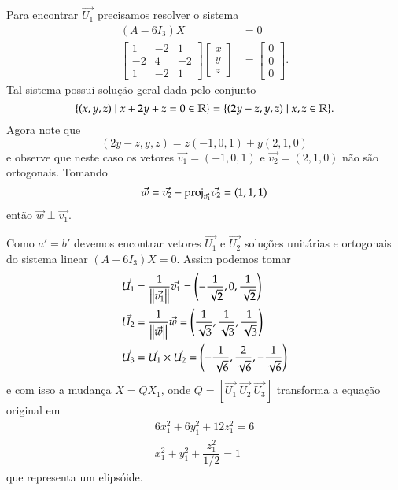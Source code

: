 \begin{exemplos}
\begin{enumerate}
\begin{solucao}
			Para encontrar $\vec{U_1}$ precisamos resolver o sistema
			\begin{align*}
				(A - 6I_3)X &= 0\\
				\begin{bmatrix}
					1 & -2 & 1\\
					-2 & 4 & -2\\
					1 & -2 & 1
				\end{bmatrix} \begin{bmatrix}
					x\\ y\\ z
				\end{bmatrix} &= \begin{bmatrix}
					0 \\ 0\\ 0
				\end{bmatrix}.
			\end{align*}
			Tal sistema possui solu\c{c}\~ao geral dada pelo conjunto
			\[
				\{(x, y, z) \mid x + 2y + z = 0 \in \mathbb{R}\} = \{(2y - z, y, z) \mid x, z \in \mathbb{R}\}.
			\]
			Agora note que
			\[
				(2y - z, y, z) = z(-1, 0, 1) + y(2, 1, 0)
			\]
			e observe que neste caso os vetores $\vec{v_1} = (-1,0,1)$ e $\vec{v_2} = (2,1,0)$ n\~ao s\~ao ortogonais. Tomando
			\[
				\vec{w} = \vec{v_2} - {\rm proj}_{\vec{v_1}}\vec{v_2} = (1, 1, 1)
			\]
			ent\~ao $\vec{w}\perp \vec{v_1}$.

			Como $a' = b'$ devemos encontrar vetores $\vec{U_1}$ e $\vec{U_2}$ solu\c{c}\~oes unit\'arias e ortogonais do sistema linear $(A - 6I_3)X = 0$. Assim podemos tomar
			\begin{align*}
				\vec{U_1} &= \dfrac{1}{\left\Vert{\vec{v_1}}\right\Vert}\vec{v_1} = \left(-\dfrac{1}{\sqrt{2}},0,\dfrac{1}{\sqrt{2}}\right)\\
				\vec{U_2} &= \dfrac{1}{\left\Vert{\vec{w}}\right\Vert}\vec{w} = \left(\dfrac{1}{\sqrt{3}},\dfrac{1}{\sqrt{3}},\dfrac{1}{\sqrt{3}}\right)\\
				\vec{U_3} &= \vec{U_1}\times\vec{U_2} = \left(-\dfrac{1}{\sqrt{6}},\dfrac{2}{\sqrt{6}},-\dfrac{1}{\sqrt{6}}\right)
			\end{align*}
			e com isso a mudan\c{c}a $X = QX_1$, onde $Q = [\vec{U_1}\ \vec{U_2}\ \vec{U_3}]$ transforma a equa\c{c}\~ao original em
			\begin{align*}
				6x_1^2 + 6y_1^2 + 12z_1^2 = 6\\
				x_1^2 + y_1^2 + \dfrac{z_1^2}{1/2} = 1
			\end{align*}
			que representa um elips\'oide.
		\end{solucao}
	\end{enumerate}
\end{exemplos}




